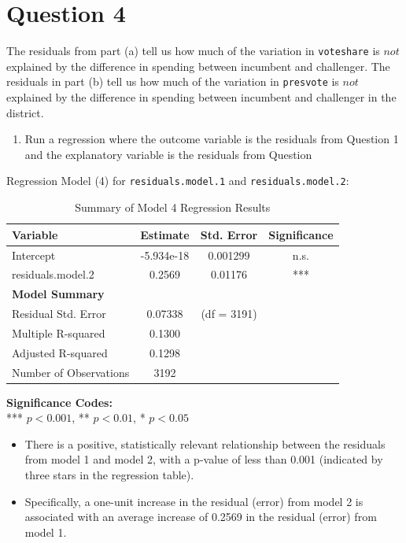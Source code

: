 \documentclass[12pt,letterpaper]{article}
\begin{document}
\section*{Question 4}
\noindent The residuals from part (a) tell us how much of the variation in \texttt{voteshare} is $not$ explained by the difference in spending between incumbent and challenger. The residuals in part (b) tell us how much of the variation in \texttt{presvote} is $not$ explained by the difference in spending between incumbent and challenger in the district.
\vspace{0.5cm} \noindent\begin{enumerate}[left=0pt]
\item Run a regression where the outcome variable is the residuals from Question 1 and the explanatory variable is the residuals from Question 
\end{enumerate}
\noindent Regression Model (4) for \texttt{residuals.model.1} and \texttt{residuals.model.2}: 
\noindent
\begin{table}[h!]
	\centering
	\caption{Summary of Model 4 Regression Results}
	\vspace{0.25cm}
	\begin{tabular}{lccc}
		\toprule
		\textbf{Variable} & \textbf{Estimate} & \textbf{Std. Error} & \textbf{Significance} \\ 
		\midrule
		Intercept              & -5.934e-18 & 0.001299 & n.s. \\ 
		residuals.model.2      & 0.2569     & 0.01176  & *** \\ 
		\midrule
		\textbf{Model Summary} & & & \\
		Residual Std. Error    & 0.07338  & (df = 3191) & \\ 
		Multiple R-squared     & 0.1300   & & \\ 
		Adjusted R-squared     & 0.1298   & & \\ 
		Number of Observations & 3192     & & \\ 
		\bottomrule
	\end{tabular}
\end{table}

\vspace{0.1cm}
\noindent\textbf{Significance Codes:} \\
*** $p < 0.001$, ** $p < 0.01$, * $p < 0.05$

\vspace{0.5cm} \begin{itemize}[left=0pt, label=\textbullet]
	\item
	\noindent There is a positive, statistically relevant relationship between the residuals from model 1 and model 2, with a p-value of less than 0.001 (indicated by three stars in the regression table).
	\item
	\noindent Specifically, a one-unit increase in the residual (error) from model 2 is associated with an average increase of 0.2569 in the residual (error) from model 1.  
\end{itemize}
\end{document}
